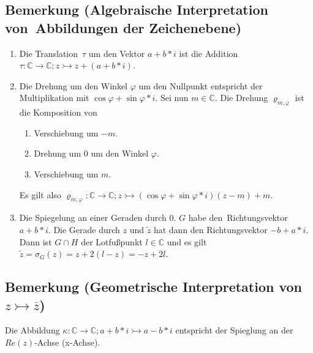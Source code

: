 \subsection{Bemerkung (Algebraische Interpretation von Abbildungen der Zeichenebene)}
\begin{enumerate}
\item Die Translation $\tau$ um den Vektor $a + b * i$ ist die Addition
	$\tau: \mathbb{C} \rightarrow \mathbb{C}; z \rightarrowtail z + (a + b * i)$.
\item Die Drehung um den Winkel $\varphi$ um den Nullpunkt entspricht der Multiplikation mit $\cos{\varphi} + \sin{\varphi} * i$.
	Sei nun $m \in \mathbb{C}$.
	Die Drehung $\varrho_{m, \varphi}$ ist die Komposition von
	\begin{enumerate}
	\item Verschiebung um $-m$.
	\item Drehung um 0 um den Winkel $\varphi$.
	\item Verschiebung um $m$.
	\end{enumerate}
	Es gilt also $\varrho_{m, \varphi}: \mathbb{C} \rightarrow \mathbb{C}; z \rightarrowtail (\cos{\varphi} + \sin{\varphi} * i) (z-m) + m$.
\item Die Spiegelung an einer Geraden durch 0.
	$G$ habe den Richtungsvektor $a + b *i$.
	Die Gerade durch $z$ und $\tilde{z}$ hat dann den Richtungsvektor $-b + a * i$.
	Dann ist $G \cap H$ der Lotfußpunkt $l \in \mathbb{C}$ und es gilt $\tilde{z} = \sigma_G(z) = z + 2 (l - z) = -z + 2l$.
\end{enumerate}

\subsection{Bemerkung (Geometrische Interpretation von $z \rightarrowtail \overline{z}$)}
Die Abbildung $\kappa: \mathbb{C} \rightarrow \mathbb{C}; a+b*i \rightarrowtail a-b*i$ entspricht der Spieglung an der $Re(z)$-Achse (x-Achse).

